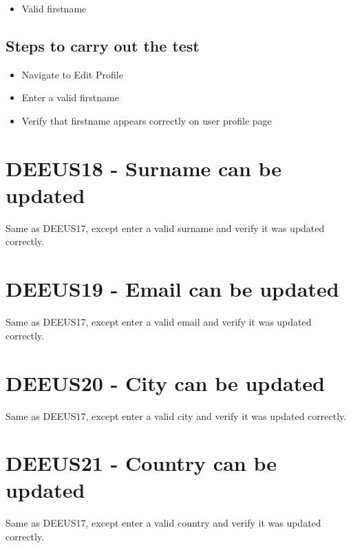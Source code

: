 \documentclass{article}
\begin{document}
\begin{itemize}
  \item Valid firstname
\end{itemize}

\subsection*{Steps to carry out the test}

\begin{itemize}
  \item Navigate to Edit Profile
  \item Enter a valid firstname
  \item Verify that firstname appears correctly on user profile page
\end{itemize}

\section*{DEEUS18 - Surname can be updated}

Same as DEEUS17, except enter a valid surname and verify it was updated correctly.

\section*{DEEUS19 - Email can be updated}

Same as DEEUS17, except enter a valid email and verify it was updated correctly.

\section*{DEEUS20 - City can be updated}

Same as DEEUS17, except enter a valid city and verify it was updated correctly.

\section*{DEEUS21 - Country can be updated}

Same as DEEUS17, except enter a valid country and verify it was updated correctly.
\end{document}
